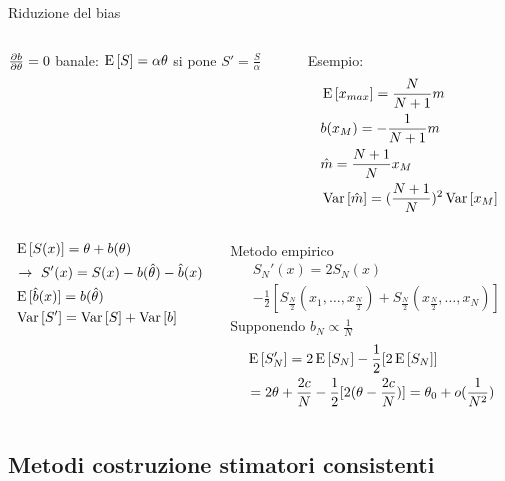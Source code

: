 \documentclass[asd-beamer.tex]{subfiles}
\begin{document}
\begin{frame}{Riduzione del bias}
	\begin{columns}[T]
		\begin{column}{0.5\textwidth}
			$\frac{\partial b}{\partial \theta}=0$ banale: $\operatorname{E}{[S]}=\alpha\theta$ si pone $S'=\frac{S}{\alpha}$
		\end{column}
		\begin{column}{0.5\textwidth}
			Esempio:
			\begin{align*}
			&\operatorname{E}{[x_{max}]}=\frac{N}{N+1}m\\
			&b(x_M)=-\frac{1}{N+1}m\\
			&\hat{m}=\frac{N+1}{N}x_M\\
			&\operatorname{Var}{[\hat{m}]}=(\frac{N+1}{N})^2\operatorname{Var}{[x_M]}
			\end{align*}
		\end{column}
	\end{columns}
	\begin{columns}[T]
		\begin{column}{0.5\textwidth}
			\begin{align*}
			&\operatorname{E}{[S(x)]}=\theta+b(\theta)\\
			&\to\ S'(x)=S(x)-b(\hat{\theta})-\hat{b}(x)\\
			&\operatorname{E}{[\hat{b}(x)]}=b(\hat{\theta})\\
			&\operatorname{Var}{[S']}=\operatorname{Var}{[S]}+\operatorname{Var}{[b]}
			\end{align*}
		\end{column}
		\begin{column}{0.5\textwidth}
			Metodo empirico
			\begin{align*}
			&S_N'(x)=2S_N(x)\\
			&-\frac{1}{2}[S_{\frac{N}{2}}(x_1,\ldots,x_{\frac{N}{2}})+S_{\frac{N}{2}}(x_{\frac{N}{2}},\ldots,x_N)]
			\end{align*}
			Supponendo $b_N\propto\frac{1}{N}$
			\begin{align*}
			&\operatorname{E}{[S_N']}=2\operatorname{E}{[S_N]}-\frac{1}{2}[2\operatorname{E}{[S_N]}]\\
			&=2\theta+\frac{2c}{N}-\frac{1}{2}[2(\theta-\frac{2c}{N})]=\theta_0+o(\frac{1}{N^2})
			\end{align*}
		\end{column}
	\end{columns}
\end{frame}

\subsection{Metodi costruzione stimatori consistenti}
\end{document}
